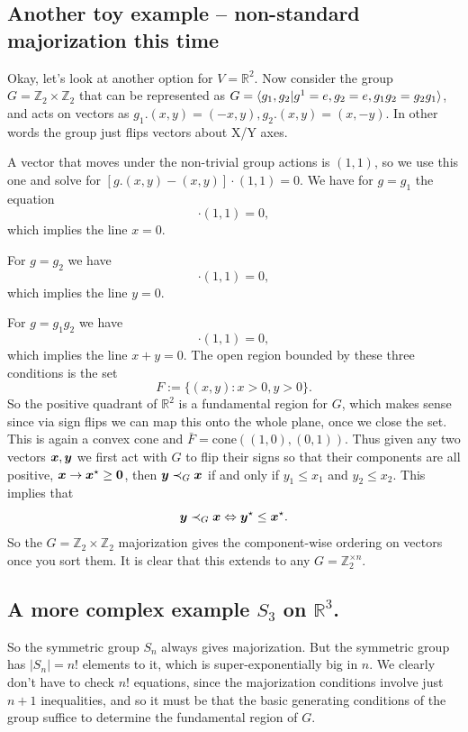 \documentclass[pra,
aps,
twocolumn,
superscriptaddress,
groupedaddress,
nofootinbib,
reprint
]{revtex4-1}
\begin{document}
\subsection{Another toy example -- non-standard majorization this time}
Okay, let's look at another option for $V=\mathbb{R}^2$. Now consider the group $G=\mathbb{Z}_2 \times \mathbb{Z}_2$ that can be represented as $G=\langle g_1,g_2 | g^1=e, g_2 = e, g_1g_2 = g_2g_1\rangle$, and acts on vectors as $g_1.(x,y) = (-x,y), g_2.(x,y)=(x,-y)$. In other words the group just flips vectors about X/Y axes.

A vector that moves under the non-trivial group actions is $(1,1)$, so we use this one and solve for $[g.(x,y) - (x,y)] \cdot (1,1) = 0$. We have for $g = g_1$ the equation
\begin{equation}
[(-x,y) - (x,y)]\cdot (1,1) = 0,
\end{equation}
which implies the line $x=0$.

For $g=g_2$ we have
\begin{equation}
[(x,-y) - (x,y)]\cdot (1,1) = 0,
\end{equation}
which implies the line $y=0$.

For $g=g_1g_2$ we have
\begin{equation}
[(-x,-y) - (x,y)]\cdot (1,1) = 0,
\end{equation}
which implies the line $x+y=0$. The open region bounded by these three conditions is the set
\begin{equation}
F := \{ (x,y) : x>0, y>0\}.
\end{equation}
So the positive quadrant of $\mathbb{R}^2$ is a fundamental region for $G$, which makes sense since via sign flips we can map this onto the whole plane, once we close the set. This is again a convex cone and $\bar{F} = \mbox{cone}((1,0), (0,1))$. Thus given any two vectors $\boldsymbol{x},\boldsymbol{y}$ we first act with $G$ to flip their signs so that their components are all positive, $\boldsymbol{x} \rightarrow \boldsymbol{x}^\star\ge \mathbf{0}$, then $\boldsymbol{y} \prec_G \boldsymbol{x}$ if and only if $y_1 \le x_1$ and $y_2 \le x_2$. This implies that 
\begin{equation}
\boldsymbol{y} \prec_G \boldsymbol{x} \Leftrightarrow \boldsymbol{y}^\star \le \boldsymbol{x}^\star. 
\end{equation}
So the $G=\mathbb{Z}_2 \times \mathbb{Z}_2$ majorization gives the component-wise ordering on vectors once you sort them. It is clear that this extends to any $G=\mathbb{Z}_2^{\times n}$.
\subsection{A more complex example $S_3$ on $\mathbb{R}^3$.}
So the symmetric group $S_n$ always gives majorization. But the symmetric group has $|S_n| = n!$ elements to it, which is super-exponentially big in $n$. We clearly don't have to check $n!$ equations, since the majorization conditions involve just $n+1$ inequalities, and so it must be that the basic generating conditions of the group suffice to determine the fundamental region of $G$.
\end{document}
